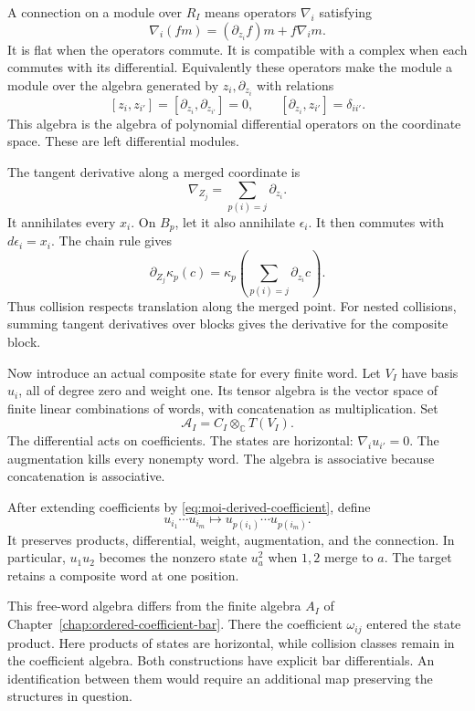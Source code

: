 A connection on a module over $R_I$ means operators $\nabla_i$
satisfying
\[
 \nabla_i(fm)=(\partial_{z_i}f)m+f\nabla_i m.
\]
It is flat when the operators commute.
It is compatible with a complex when each commutes with its
differential.
Equivalently these operators make the module a module over the
algebra generated by $z_i,\partial_{z_i}$ with relations
\[
 [z_i,z_{i'}]=[\partial_{z_i},\partial_{z_{i'}}]=0,\qquad
 [\partial_{z_i},z_{i'}]=\delta_{ii'}.
\]
This algebra is the algebra of polynomial differential operators
on the coordinate space. These are left differential modules.

The tangent derivative along a merged coordinate is
\[
 \nabla_{Z_j}=\sum_{p(i)=j}\partial_{z_i}.
\]
It annihilates every $x_i$.
On $B_p$, let it also annihilate $\epsilon_i$.
It then commutes with $d\epsilon_i=x_i$.
The chain rule gives
\begin{equation}\label{eq:moi-connection}
 \partial_{Z_j}\kappa_p(c)
 =\kappa_p\left(\sum_{p(i)=j}\partial_{z_i}c\right).
\end{equation}
Thus collision respects translation along the merged point.
For nested collisions, summing tangent derivatives over blocks
gives the derivative for the composite block.

Now introduce an actual composite state for every finite word.
Let $V_I$ have basis $u_i$, all of degree zero and weight one.
Its tensor algebra is the vector space of finite linear
combinations of words, with concatenation as multiplication.
Set
\[
 \mathcal A_I=C_I\otimes_{\mathbb C}T(V_I).
\]
The differential acts on coefficients. The states are horizontal:
$\nabla_i u_{i'}=0$.
The augmentation kills every nonempty word.
The algebra is associative because concatenation is associative.

After extending coefficients by \eqref{eq:moi-derived-coefficient},
define
\[
 u_{i_1}\cdots u_{i_m}
 \longmapsto u_{p(i_1)}\cdots u_{p(i_m)}.
\]
It preserves products, differential, weight, augmentation, and
the connection. In particular, $u_1u_2$ becomes the nonzero state
$u_a^2$ when $1,2$ merge to $a$.
The target retains a composite word at one position.

This free-word algebra differs from the finite algebra $A_I$
of Chapter~\ref{chap:ordered-coefficient-bar}.
There the coefficient $\omega_{ij}$ entered the state product.
Here products of states are horizontal, while collision classes
remain in the coefficient algebra. Both constructions have
explicit bar differentials. An identification between them would
require an additional map preserving the structures in question.

